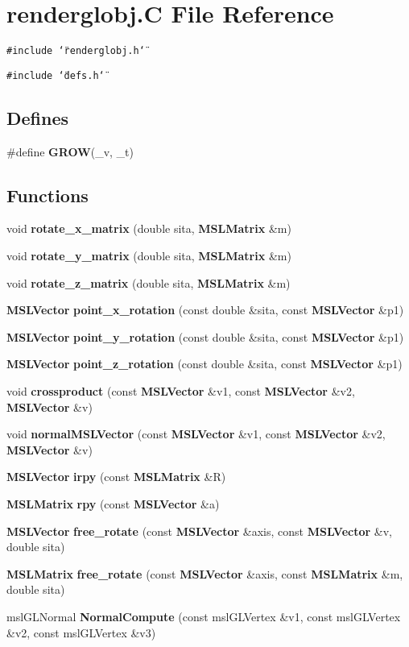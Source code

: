 \section{renderglobj.C File Reference}
\label{renderglobj_C}
{\tt \#include \char`\"{}renderglobj.h\char`\"{}}\par
{\tt \#include \char`\"{}defs.h\char`\"{}}\par
\subsection*{Defines}
\begin{CompactItemize}
\item 
\#define {\bf GROW}(\_\-v, \_\-t)
\end{CompactItemize}
\subsection*{Functions}
\begin{CompactItemize}
\item 
void {\bf rotate\_\-x\_\-matrix} (double sita, {\bf MSLMatrix} \&m)
\item 
void {\bf rotate\_\-y\_\-matrix} (double sita, {\bf MSLMatrix} \&m)
\item 
void {\bf rotate\_\-z\_\-matrix} (double sita, {\bf MSLMatrix} \&m)
\item 
{\bf MSLVector} {\bf point\_\-x\_\-rotation} (const double \&sita, const {\bf MSLVector} \&p1)
\item 
{\bf MSLVector} {\bf point\_\-y\_\-rotation} (const double \&sita, const {\bf MSLVector} \&p1)
\item 
{\bf MSLVector} {\bf point\_\-z\_\-rotation} (const double \&sita, const {\bf MSLVector} \&p1)
\item 
void {\bf crossproduct} (const {\bf MSLVector} \&v1, const {\bf MSLVector} \&v2, {\bf MSLVector} \&v)
\item 
void {\bf normal\-MSLVector} (const {\bf MSLVector} \&v1, const {\bf MSLVector} \&v2, {\bf MSLVector} \&v)
\item 
{\bf MSLVector} {\bf irpy} (const {\bf MSLMatrix} \&R)
\item 
{\bf MSLMatrix} {\bf rpy} (const {\bf MSLVector} \&a)
\item 
{\bf MSLVector} {\bf free\_\-rotate} (const {\bf MSLVector} \&axis, const {\bf MSLVector} \&v, double sita)
\item 
{\bf MSLMatrix} {\bf free\_\-rotate} (const {\bf MSLVector} \&axis, const {\bf MSLMatrix} \&m, double sita)
\item 
msl\-GLNormal {\bf Normal\-Compute} (const msl\-GLVertex \&v1, const msl\-GLVertex \&v2, const msl\-GLVertex \&v3)
\end{CompactItemize}


